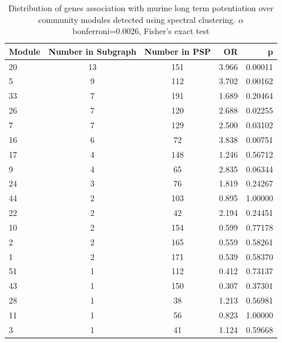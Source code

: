 \begin{table}[ht]
\centeringu
\begin{tabular}{lccrr}
  \hline
Module & Number in Subgraph & Number in PSP & OR & p \\ 
  \hline
20 & 13 & 151 & 3.966 & 0.00011 \\ 
  5 &  9 & 112 & 3.702 & 0.00162 \\ 
  33 &  7 & 191 & 1.689 & 0.20464 \\ 
  26 &  7 & 120 & 2.688 & 0.02255 \\ 
  7 &  7 & 129 & 2.500 & 0.03102 \\ 
  16 &  6 & 72 & 3.838 & 0.00751 \\ 
  17 &  4 & 148 & 1.246 & 0.56712 \\ 
  9 &  4 & 65 & 2.835 & 0.06344 \\ 
  24 &  3 & 76 & 1.819 & 0.24267 \\ 
  44 &  2 & 103 & 0.895 & 1.00000 \\ 
  22 &  2 & 42 & 2.194 & 0.24451 \\ 
  10 &  2 & 154 & 0.599 & 0.77178 \\ 
  2 &  2 & 165 & 0.559 & 0.58261 \\ 
  1 &  2 & 171 & 0.539 & 0.58370 \\ 
  51 &  1 & 112 & 0.412 & 0.73137 \\ 
  43 &  1 & 150 & 0.307 & 0.37301 \\ 
  28 &  1 & 38 & 1.213 & 0.56981 \\ 
  11 &  1 & 56 & 0.823 & 1.00000 \\ 
  3 &  1 & 41 & 1.124 & 0.59668 \\ 
   \hline
 
\end{tabular}
\caption{Distribution of genes association with murine long term potentiation over community modules detected using spectral clustering. $\alpha$ bonferroni=0.0026, Fisher's exact test}
\label{tab:Distribution of genes association with murine long term potentiation over community modules detected using spectral clustering}
\end{table}


